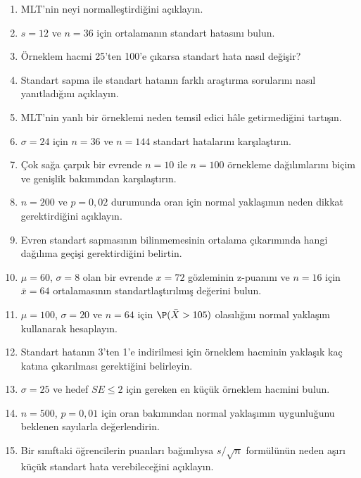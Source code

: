 \begin{enumerate}
  \item MLT'nin neyi normalleştirdiğini açıklayın.
  \item $s=12$ ve $n=36$ için ortalamanın standart hatasını bulun.
  \item Örneklem hacmi 25'ten 100'e çıkarsa standart hata nasıl değişir?
  \item Standart sapma ile standart hatanın farklı araştırma sorularını nasıl yanıtladığını açıklayın.
  \item MLT'nin yanlı bir örneklemi neden temsil edici hâle getirmediğini tartışın.
  \item $\sigma=24$ için $n=36$ ve $n=144$ standart hatalarını karşılaştırın.
  \item Çok sağa çarpık bir evrende $n=10$ ile $n=100$ örnekleme dağılımlarını biçim ve genişlik bakımından karşılaştırın.
  \item $n=200$ ve $p=0{,}02$ durumunda oran için normal yaklaşımın neden dikkat gerektirdiğini açıklayın.
  \item Evren standart sapmasının bilinmemesinin ortalama çıkarımında hangi dağılıma geçişi gerektirdiğini belirtin.
  \item $\mu=60$, $\sigma=8$ olan bir evrende $x=72$ gözleminin z-puanını
  ve $n=16$ için $\bar x=64$ ortalamasının standartlaştırılmış değerini bulun.
  \item $\mu=100$, $\sigma=20$ ve $n=64$ için $\P(\bar X>105)$ olasılığını
  normal yaklaşım kullanarak hesaplayın.
  \item Standart hatanın 3'ten 1'e indirilmesi için örneklem hacminin yaklaşık
  kaç katına çıkarılması gerektiğini belirleyin.
  \item $\sigma=25$ ve hedef $SE\leq2$ için gereken en küçük örneklem hacmini bulun.
  \item $n=500$, $p=0{,}01$ için oran bakımından normal yaklaşımın
  uygunluğunu beklenen sayılarla değerlendirin.
  \item Bir sınıftaki öğrencilerin puanları bağımlıysa $s/\sqrt n$
  formülünün neden aşırı küçük standart hata verebileceğini açıklayın.
\end{enumerate}